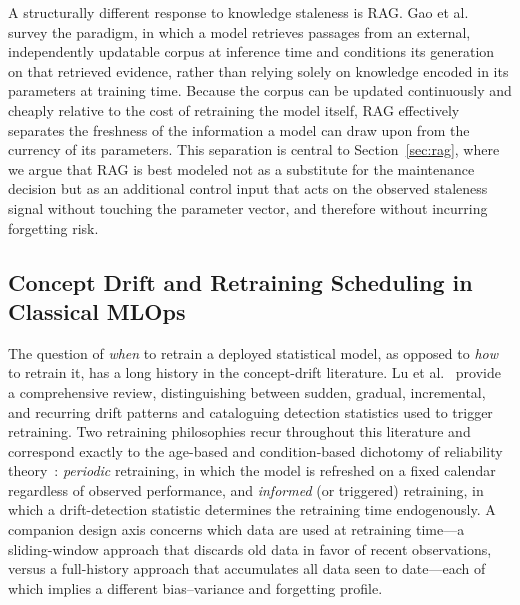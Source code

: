 \documentclass[electronics,article,submit,pdftex,moreauthors]{Definitions/mdpi}
\begin{document}
A structurally different response to knowledge staleness is RAG. Gao et al.~\cite{Gao2023} survey the paradigm, in which a model retrieves passages from an external, independently updatable corpus at inference time and conditions its generation on that retrieved evidence, rather than relying solely on knowledge encoded in its parameters at training time. Because the corpus can be updated continuously and cheaply relative to the cost of retraining the model itself, RAG effectively separates the freshness of the information a model can draw upon from the currency of its parameters. This separation is central to Section~\ref{sec:rag}, where we argue that RAG is best modeled not as a substitute for the maintenance decision but as an additional control input that acts on the observed staleness signal without touching the parameter vector, and therefore without incurring forgetting risk.

\subsection{Concept Drift and Retraining Scheduling in Classical MLOps}

The question of \textit{when} to retrain a deployed statistical model, as opposed to \textit{how} to retrain it, has a long history in the concept-drift literature. Lu et al.~\cite{Lu2019} provide a comprehensive review, distinguishing between sudden, gradual, incremental, and recurring drift patterns and cataloguing detection statistics used to trigger retraining. Two retraining philosophies recur throughout this literature and correspond exactly to the age-based and condition-based dichotomy of reliability theory~\cite{Wang2002}: \textit{periodic} retraining, in which the model is refreshed on a fixed calendar regardless of observed performance, and \textit{informed} (or triggered) retraining, in which a drift-detection statistic determines the retraining time endogenously. A companion design axis concerns which data are used at retraining time---a sliding-window approach that discards old data in favor of recent observations, versus a full-history approach that accumulates all data seen to date---each of which implies a different bias--variance and forgetting profile.
\end{document}
